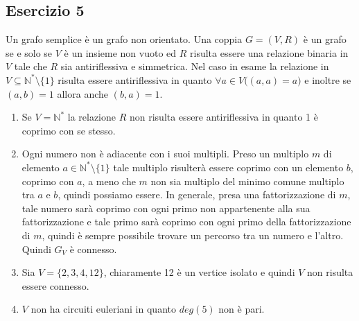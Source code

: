 \subsection*{Esercizio 5}
Un grafo semplice è un grafo non orientato. Una coppia $G=(V,R)$ è un grafo se e solo se $V$ è un insieme non vuoto ed $R$ risulta essere una relazione binaria in $V$ tale che $R$ sia antiriflessiva e simmetrica. Nel caso in esame la relazione in $V \subseteq \mathbb{N}^{*} \setminus \{1\}$ risulta essere antiriflessiva in quanto $\forall a \in V \bigl((a,a)=a\bigr)$ e inoltre se $(a,b)=1$ allora anche $(b,a)=1$.
\begin{enumerate}[label=(\textit{\roman*})]
	\item Se $V=\mathbb{N}^{*}$ la relazione $R$ non risulta essere antiriflessiva in quanto 1 è coprimo con se stesso.
	\item Ogni numero non è adiacente con i suoi multipli. Preso un multiplo $m$ di elemento $a \in \mathbb{N}^{*} \setminus \{1\}$ tale multiplo risulterà essere coprimo con un elemento $b$, coprimo con $a$, a meno che $m$ non sia multiplo del minimo comune multiplo tra $a$ e $b$, quindi possiamo essere. In generale, presa una fattorizzazione di $m$, tale numero sarà coprimo con ogni primo non appartenente alla sua fattorizzazione e tale primo sarà coprimo con ogni primo della fattorizzazione di $m$, quindi è sempre possibile trovare un percorso tra un numero e l'altro. Quindi $G_{V}$ è connesso.
	\item Sia $V=\{2,3,4,12\}$, chiaramente 12 è un vertice isolato e quindi $V$ non risulta essere connesso.
	\item $V$ non ha circuiti euleriani in quanto $deg(5)$ non è pari.
\end{enumerate}
